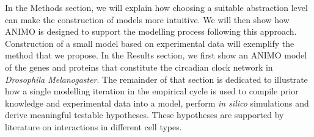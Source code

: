 In the Methods section, we will explain how choosing a suitable abstraction level can make the construction
of models more intuitive. We will then show how ANIMO is designed to support the modelling process following
this approach. Construction of a small model based on experimental data will exemplify the method that we
propose. In the Results section, we first show an ANIMO model of the genes and proteins that constitute
the circadian clock network in \emph{Drosophila Melanogaster}. The remainder of that section is dedicated to
illustrate how a single modelling iteration in the empirical cycle is used to compile prior knowledge and
experimental data into a model, perform \emph{in silico} simulations and derive meaningful testable 
hypotheses. These hypotheses are supported by literature on interactions in different cell types.
